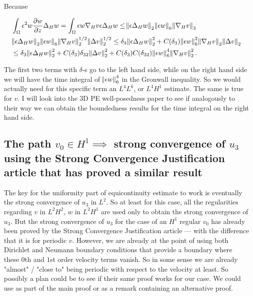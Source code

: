 \documentclass[11pt]{article}
\begin{document}
Because

\begin{equation}
\begin{split} \nonumber
& \int_\Omega \epsilon^2 w \frac{\partial w}{\partial z} \Delta_H w = \int_\Omega \epsilon w \nabla_H v \epsilon \Delta_H w \leq \norm{\epsilon \Delta_H w}_2 \norm{\epsilon w}_6 \norm{\nabla_H v}_3 \\
& \norm{\epsilon \Delta_H w}_2 \norm{\epsilon w}_6 \norm{\nabla_H v}^{1/2}_2 \norm{\Delta v}^{1/2}_2 \leq \delta_3 \norm{\epsilon \Delta_H w}_2^2 + C(\delta_3) \norm{\epsilon w}^2_6 \norm{\nabla_H v}_2 \norm{\Delta v}_2 \\
& \leq  \delta_3 \norm{\epsilon \Delta_H w}_2^2 + C(\delta_3) \delta_{32 } \norm{\Delta v}^2_2 + C(\delta_3) C(\delta_{32}) \norm{\epsilon w}^4_6 \norm{\nabla_H v}^2_2.
\end{split}
\end{equation}

The first two terms with $\delta$-s go to the left hand side, while on the right hand side we will have the time integral of $\norm{\epsilon w}^4_6$ in the Gronwall inequality.
So we would actually need for this specific term an $L^4 L^6$, or $L^4 H^1$ estimate. The same is true for $v$. I will look into the 3D PE well-posedness paper to see if analogously to their way we can obtain the boundedness results for the time integral on the right hand side.
  
  \subsection{The path $v_0 \in H^1 \implies$ strong convergence of $u_3$ using the Strong Convergence Justification article that has proved a similar result}
  
  The key for the uniformity part of equicontinuity estimate to work is eventually the strong convergence of $u_3$ in $L^2$. So at least for this case, all the regularities regarding $v$ in $L^2 H^2$, $w$ in $L^2 H^1$ are used only to obtain the strong convergence of $u_3$. But the strong convergence of $u_3$ for the case of an $H^1$ regular $v_0$ has already been proved by the Strong Convergence Justification article --- with the difference that it is for periodic $v$. However, we are already at the point of using both Dirichlet and Neumann boundary conditions that provide a boundary where these $0$th and $1$st order velocity terms vanish. So in some sense we are already "almost" / "close to" being periodic with respect to the velocity at least. So possibly a plan could be to see if their same proof works for our case. We could use as part of the main proof or as a remark containing an alternative proof.
\end{document}
